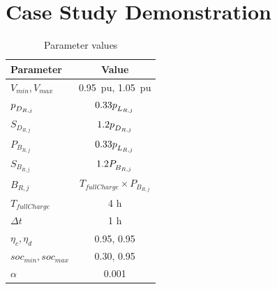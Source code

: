 \documentclass[../../outputs/main.tex]{subfiles}
\begin{document}
\section{Case Study Demonstration}


\def\ds{\rule{0pt}{1.5ex}} %

\begin{table}[t]
    \centering
    \caption{Parameter values}
    \begin{tabular}{|l|c|}
    \hline
    \textbf{Parameter} & \textbf{Value} \\ \hline
    $V_{min}, V_{max}$ & 0.95\, pu, 1.05\, pu \\ \hline
    $p_{\ds D_{R,j}}$ & $0.33 p_{\ds L_{R,j}}$ \\ \hline
    $S_{D_{R,j}}$ & $1.2 p_{\ds D_{R,j}}$ \\ \hline
    $P_{B_{R,j}}$ & $0.33 p_{\ds L_{R,j}}$ \\ \hline
    $S_{B_{R,j}}$ & $1.2 P_{\ds B_{R,j}}$ \\ \hline
    $B_{R,j}$ & $T_{fullCharge} \times P_{B_{R,j}}$ \\ \hline
    $T_{fullCharge}$ & 4 h \\ \hline
    $\Delta t$ & 1 h \\ \hline
    $\eta_c, \eta_d$ & 0.95, 0.95 \\ \hline
    $soc_{min}, soc_{max}$ & 0.30, 0.95 \\ \hline
    $\alpha$ & 0.001 \\ \hline
    \end{tabular}
    \label{table:parameter-values}
\end{table}
\end{document}
